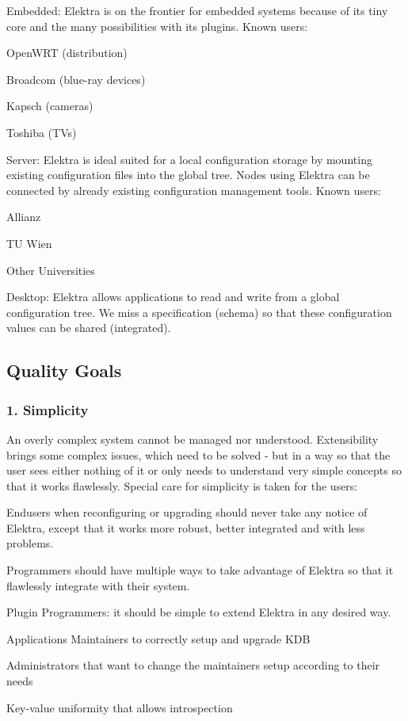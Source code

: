 \begin{DoxyItemize}
\item Embedded\+: Elektra is on the frontier for embedded systems because of its tiny core and the many possibilities with its plugins. Known users\+:
\begin{DoxyItemize}
\item Open\+W\+RT (distribution)
\item Broadcom (blue-\/ray devices)
\item Kapsch (cameras)
\item Toshiba (T\+Vs)
\end{DoxyItemize}
\item Server\+: Elektra is ideal suited for a local configuration storage by mounting existing configuration files into the global tree. Nodes using Elektra can be connected by already existing configuration management tools. Known users\+:
\begin{DoxyItemize}
\item Allianz
\item TU Wien
\item Other Universities
\end{DoxyItemize}
\item Desktop\+: Elektra allows applications to read and write from a global configuration tree. We miss a specification (schema) so that these configuration values can be shared (integrated).
\end{DoxyItemize}

\subsection*{Quality Goals}

\subsubsection*{1. Simplicity}

An overly complex system cannot be managed nor understood. Extensibility brings some complex issues, which need to be solved -\/ but in a way so that the user sees either nothing of it or only needs to understand very simple concepts so that it works flawlessly. Special care for simplicity is taken for the users\+:


\begin{DoxyItemize}
\item Endusers when reconfiguring or upgrading should never take any notice of Elektra, except that it works more robust, better integrated and with less problems.
\item Programmers should have multiple ways to take advantage of Elektra so that it flawlessly integrate with their system.
\item Plugin Programmers\+: it should be simple to extend Elektra in any desired way.
\item Application\textquotesingle{}s Maintainers to correctly setup and upgrade K\+DB
\item Administrators that want to change the maintainers\textquotesingle{} setup according to their needs
\item Key-\/value uniformity that allows introspection
\end{DoxyItemize}

